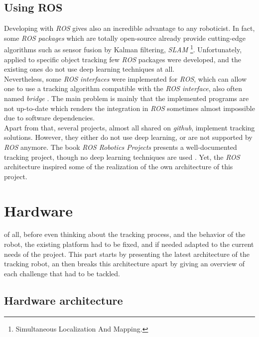 		
		\section{Using ROS}
		
		Developing with \textit{ROS} gives also an incredible
		advantage to any roboticist. In fact, some \textit{ROS packages}
		which are totally open-source already provide cutting-edge algorithms
		such as sensor fusion by Kalman filtering, \textit{SLAM}
		\footnote{Simultaneous Localization And Mapping.}. Unfortunately, 
		applied to specific object tracking few \textit{ROS} packages were developed, and
		the existing ones do not use deep learning techniques at all.
		\\\indent Nevertheless, some \textit{ROS interfaces} were implemented
		for \textit{ROS}, which can allow one to use a tracking algorithm
		compatible with the \textit{ROS interface}, also often named
		\textit{bridge} \cite{mtf}. The main problem is mainly that the implemented
		programs are not up-to-date which renders the integration
		in \textit{ROS} sometimes almost impossible due to software dependencies.
		\\\indent Apart from that, several projects, almost all shared on
		\textit{github}, implement tracking solutions. However, they 
		either do not use deep learning, or are not supported by \textit{ROS} 
		anymore. The book \textit{ROS Robotics Projects} presents
		a well-documented tracking project, though no
		deep learning techniques are used \cite{rosprojects}. Yet, 
		the \textit{ROS} architecture inspired some of the realization 
		of the own architecture of this project.


\chapter{Hardware}\label{hardware}

 of all, before even thinking about the tracking process, and
the behavior of the robot, the existing platform had to be fixed, and if needed adapted
to the current needs of the project. This part starts by presenting the latest architecture 
of the tracking robot, an then breaks this architecture apart by giving an overview of
each challenge that had to be tackled.
	
	\section{Hardware architecture}
	
